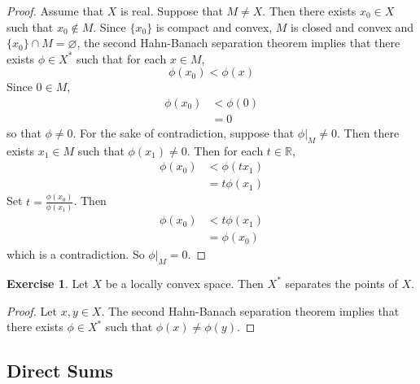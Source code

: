 \documentclass[12pt]{amsart}
\theoremstyle{definition}
\newtheorem{ex}[definition]{Exercise}
\newcommand{\R}{\mathbb{R}}
\DeclareMathOperator*{\0}{\mbf{0}}
\DeclareMathOperator*{\1}{\mbf{1}}
\begin{document}
	\begin{proof}
		Assume that $X$ is real. Suppose that $M \neq X$. Then there exists $x_0 \in X$ such that $x_0 \not \in M$. Since $\{x_0\}$ is compact and convex, $M$ is closed and convex and $\{x_0\} \cap M = \varnothing$, the second Hahn-Banach separation theorem implies that there exists $\phi \in X^*$ such that for each $x \in M$, $$\phi(x_0) < \phi(x)$$
		Since $0 \in M$, 
		\begin{align*}
			\phi(x_0)
			&< \phi(0) \\
			&= 0
		\end{align*}
	so that $\phi \neq 0$. For the sake of contradiction, suppose that $\phi|_M \neq 0$. Then there exists $x_1 \in M$ such that $\phi(x_1) \neq 0$. Then for each $t \in \R$, 
	\begin{align*}
		\phi(x_0) 
		&< \phi(tx_1) \\
		&= t \phi(x_1)
	\end{align*}
	Set $t = \frac{\phi(x_0)}{\phi(x_1)}$. Then 
	\begin{align*}
		\phi(x_0) 
		&< t \phi(x_1) \\
		&= \phi(x_0)
	\end{align*}
	which is a contradiction. So $\phi|_M = 0$.
	\end{proof}

	\begin{ex}
		Let $X$ be a locally convex space. Then $X^*$ separates the points of $X$. 
	\end{ex}

	\begin{proof}
		Let $x, y \in X$. The second Hahn-Banach separation theorem implies that there exists $\phi \in X^*$ such that $\phi(x) \neq \phi(y)$. 
	\end{proof}









	
	
	
	
	
	
	
	
	
	
	
	
	
	
	
	
	\newpage
	\subsection{Direct Sums}
\end{document}
